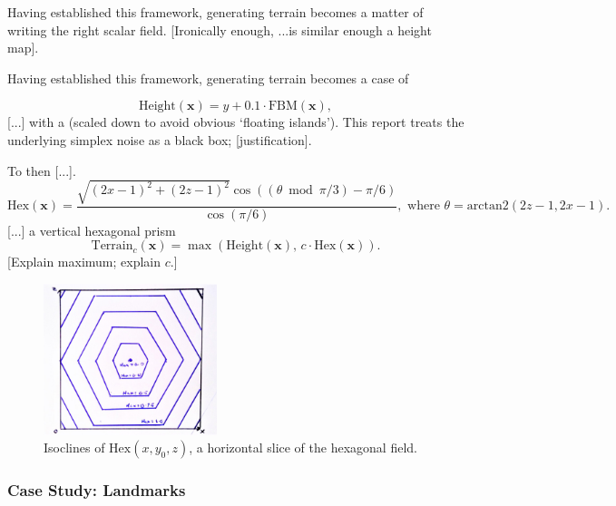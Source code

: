 \documentclass[a4paper, 11pt]{article}
\begin{document}
\begin{flushleft}
Having established this framework, generating terrain becomes a matter of writing the right scalar field. [Ironically enough, ...is similar enough a height map]. %

\vspace{5pt}\noindent
Having established this framework, generating terrain becomes a case of 

$$\textrm{Height}(\mathbf{x}) = y + 0.1\cdot\textrm{FBM}(\mathbf{x}),$$
[...] with a (scaled down to avoid obvious `floating islands'). This report treats the underlying simplex noise as a black box; [justification].

\vspace{5pt}\noindent
To then [...].
$$\textrm{Hex}(\mathbf{x}) = \frac{\sqrt{(2x-1)^2+(2z-1)^2}\cos\left((\theta\bmod\pi/3)-\pi/6\right)}{\cos\left(\pi/6\right)}, \,\, \textrm{where} \,\, \theta = \textrm{arctan2}\left(2z-1, 2x-1\right).$$
[...] a vertical hexagonal prism
$$\textrm{Terrain}_c(\mathbf{x}) = \max\left(\textrm{Height}(\mathbf{x}), \, c\cdot\textrm{Hex}(\mathbf{x})\right).$$
[Explain maximum; explain $c$.]%

\vspace{5pt} 

\vspace{5pt}\noindent
\begin{figure}[h]
\centering
\includegraphics[width=0.45\textwidth]{Hex Field}
\caption{Isoclines of $\textrm{Hex}(x,y_0,z)$, a horizontal slice of the hexagonal field.}
\label{Hex Field}
\end{figure}

\subsubsection{Case Study: Landmarks}


\end{flushleft}
\end{document}
